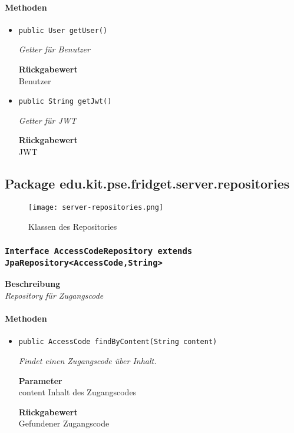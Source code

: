     \paragraph*{Methoden}
     \begin{itemize}
     	\item{\texttt{public User getUser()}}
     	
     	\textit{Getter für Benutzer}
     	
     	
     	
     	\textbf{Rückgabewert} \\
     	Benutzer        \item{\texttt{public String getJwt()}}
     	
     	\textit{Getter für JWT}
     	
     	
     	
     	\textbf{Rückgabewert} \\
     	JWT
     \end{itemize}
     \subsection{Package edu.kit.pse.fridget.server.repositories}
     \begin{figure}[H]
	       \centering
	       \texttt{[image: server-repositories.png]}
	       \caption{Klassen des Repositories}
	      \end{figure}
     \subsubsection{\texttt{Interface AccessCodeRepository extends JpaRepository<AccessCode,String>}}
     \textbf{Beschreibung} \\
     \textit{Repository für Zugangscode}
     \paragraph*{Methoden}
     \begin{itemize}
     	\item{\texttt{public AccessCode findByContent(String content)}}
     	
     	\textit{Findet einen Zugangscode über Inhalt.}
     	
     	\textbf{Parameter} \\
     	content Inhalt des Zugangscodes
     	
     	\textbf{Rückgabewert} \\
     	Gefundener Zugangscode
     \end{itemize}

